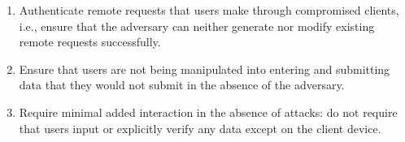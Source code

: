 \begin{enumerate}[leftmargin=*]
	\item Authenticate remote requests that users make through compromised clients, i.e., ensure that the adversary can neither generate nor modify existing remote requests successfully.

	\item Ensure that users are not being manipulated into entering and submitting data that they would not submit in the absence of the adversary.

	\item Require minimal added interaction in the absence of attacks: do not require that users input or explicitly verify any data except on the client device.
\end{enumerate}
